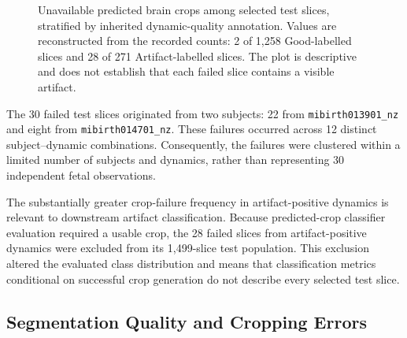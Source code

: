 \begin{figure}[htbp]
\centering
{}
\caption{Unavailable predicted brain crops among selected test slices, stratified by inherited dynamic-quality annotation. Values are reconstructed from the recorded counts: 2 of 1,258 Good-labelled slices and 28 of 271 Artifact-labelled slices. The plot is descriptive and does not establish that each failed slice contains a visible artifact.}
\label{fig:results_crop_failure_rates_reconstructed}
\end{figure}

The 30 failed test slices originated from two subjects: 22 from \texttt{mibirth013901\_nz} and eight from \texttt{mibirth014701\_nz}. These failures occurred across 12 distinct subject--dynamic combinations. Consequently, the failures were clustered within a limited number of subjects and dynamics, rather than representing 30 independent fetal observations.

The substantially greater crop-failure frequency in artifact-positive dynamics is relevant to downstream artifact classification. Because predicted-crop classifier evaluation required a usable crop, the 28 failed slices from artifact-positive dynamics were excluded from its 1,499-slice test population. This exclusion altered the evaluated class distribution and means that classification metrics conditional on successful crop generation do not describe every selected test slice.

\subsection{Segmentation Quality and Cropping Errors}
\label{subsec:results_crop_quality}

